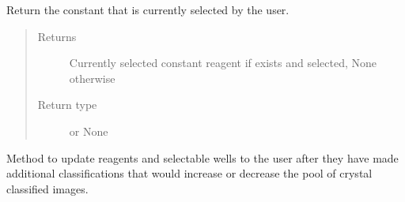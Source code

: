 \documentclass[letterpaper,10pt,english]{sphinxmanual}
\begin{document}
\begin{fulllineitems}
\begin{fulllineitems}
\end{fulllineitems}


\begin{fulllineitems}
\label{\detokenize{polo.widgets:polo.widgets.optimize_widget.OptimizeWidget.run}}
\end{fulllineitems}


\begin{fulllineitems}
\label{\detokenize{polo.widgets:polo.widgets.optimize_widget.OptimizeWidget.selected_constant}}
Return the constant  that is currently
selected by the user.
\begin{quote}\begin{description}
\item[{Returns}] \leavevmode
Currently selected constant reagent if exists and selected, 
None otherwise

\item[{Return type}] \leavevmode
{\hyperref[\detokenize{polo.crystallography:polo.crystallography.cocktail.Reagent}]{}} or None

\end{description}\end{quote}

\end{fulllineitems}


\begin{fulllineitems}
\label{\detokenize{polo.widgets:polo.widgets.optimize_widget.OptimizeWidget.update}}
Method to update reagents and selectable wells to the user after
they have made additional classifications that would increase or
decrease the pool of crystal classified images.


\end{fulllineitems}
\end{fulllineitems}
\end{document}
